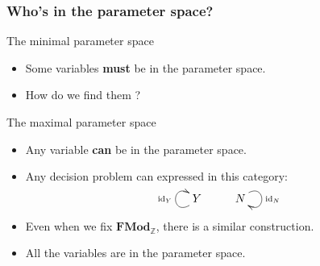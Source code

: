\documentclass[10pt]{beamer}
\newcommand{\lcat}[1]{\mathbf{#1}}
\DeclareMathOperator{\id}{id}
\newcommand{\Z}{\mathbb{Z}}
\begin{document}
\begin{frame}
  \frametitle{Who's in the parameter space?}
  
  \begin{block}{The minimal parameter space}
    \begin{itemize}
    \item Some variables \textbf{must} be in the parameter space.
    \item How do we find them ?
    \end{itemize}
  \end{block}

  \begin{block}{The maximal parameter space}
    \begin{itemize}
    \item Any variable \textbf{can} be in the parameter space.
    \item Any decision problem can expressed in this category:
      \[\xymatrix{ Y \ar@(dl,ul)^{\id_Y} & N \ar@(ur,dr)^{\id_N} }\]
    \item Even when we fix $\lcat{FMod}_{\Z}$, there is a similar construction.
    \item \alert{All the variables are in the parameter space.}
    \end{itemize}
  \end{block}
\end{frame}
\end{document}
